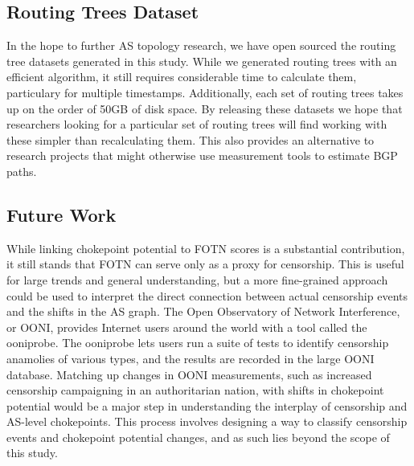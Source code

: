 \documentclass[10pt, conference, letterpaper]{IEEEtran}
\begin{document}
\subsection{Routing Trees Dataset}
In the hope to further AS topology research, we have open sourced the routing tree datasets generated in this study. While we generated routing trees
with an efficient algorithm, it still requires considerable time to calculate them, particulary for multiple timestamps. Additionally, each set of routing trees
takes up on the order of 50GB of disk space. By releasing these datasets we hope that researchers looking for a particular set of routing trees will find
working with these simpler than recalculating them. This also provides an alternative to research projects that might otherwise use measurement tools to estimate
BGP paths.



\subsection{Future Work}
While linking chokepoint potential to FOTN scores is a substantial contribution, it still stands that FOTN can serve only as a proxy for censorship.
This is useful for large trends and general understanding, but a more fine-grained approach could be used to interpret the direct connection between
actual censorship events and the shifts in the AS graph. The Open Observatory of Network Interference, or OONI, \cite{OONI} provides Internet users around
the world with a tool called the ooniprobe. The ooniprobe lets users run a suite of tests to identify censorship anamolies of various types, and the results are
recorded in the large OONI database. Matching up changes in OONI measurements, such as increased censorship campaigning in an authoritarian nation, with shifts
in chokepoint potential would be a major step in understanding the interplay of censorship and AS-level chokepoints. This process involves designing a way to classify
censorship events and chokepoint potential changes, and as such lies beyond the scope of this study.



\end{document}
